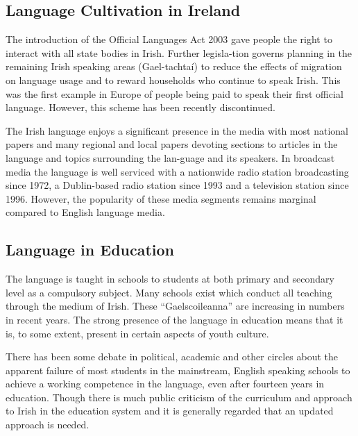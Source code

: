 \documentclass[]{../../metanetpaper}
\begin{document}
\begin{multicols}{2}

\subsection{Language Cultivation in Ireland}

The introduction of the Official Languages Act 2003 gave people the right to interact with all state bodies in Irish. Further legisla-tion governs planning in the remaining Irish speaking areas (Gael-tachtaí) to reduce the effects of migration on language usage and to reward households who continue to speak Irish. This was the first example in Europe of people being paid to speak their first official language. However, this scheme has been recently discontinued.


The Irish language enjoys a significant presence in the media with most national papers and many regional and local papers devoting sections to articles in the language and topics surrounding the lan-guage and its speakers. In broadcast media the language is well serviced with a nationwide radio station broadcasting since 1972, a Dublin-based radio station since 1993 and a television station since 1996. However, the popularity of these media segments remains marginal compared to English language media.


\subsection{Language in Education}

The language is taught in schools to students at both primary and secondary level as a compulsory subject. Many schools exist which conduct all teaching through the medium of Irish. These ``Gaelscoileanna'' are increasing in numbers in recent years. The strong presence of the language in education means that it is, to some extent, present in certain aspects of youth culture. 

There has been some debate in political, academic and other circles about the apparent failure of most students in the mainstream, English speaking schools to achieve a working competence in the language, even after fourteen years in education. Though there is much public criticism of the curriculum and approach to Irish in the education system and it is generally regarded that an updated approach is needed.



\end{multicols}
\end{document}
